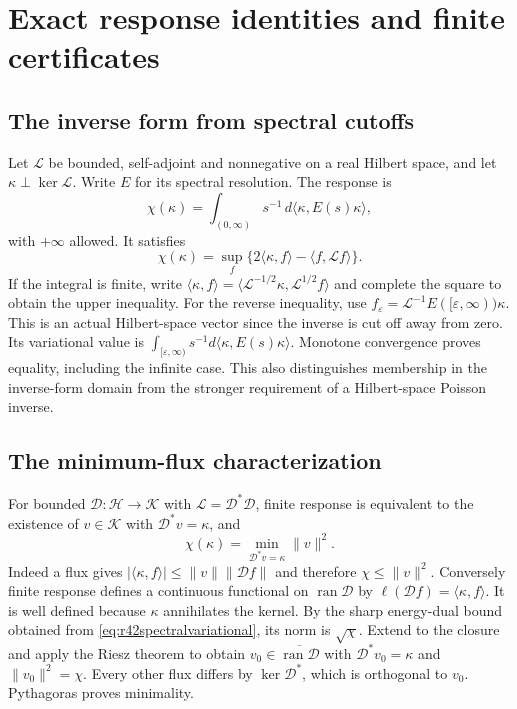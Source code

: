 \section{Exact response identities and finite certificates}
\label{app:r42certificates}

\subsection{The inverse form from spectral cutoffs}
Let $\mathscr L$ be bounded, self-adjoint and nonnegative on a real
Hilbert space, and let $\kappa\perp\ker\mathscr L$. Write $E$ for its
spectral resolution. The response is
\[
 \chi(\kappa)=\int_{(0,\infty)}s^{-1}
                                  \,d\langle\kappa,E(s)\kappa\rangle,
\]
with $+\infty$ allowed. It satisfies
\begin{equation}\label{eq:r42spectralvariational}
 \chi(\kappa)=\sup_f
       \{2\langle\kappa,f\rangle-\langle f,\mathscr Lf\rangle\}.
\end{equation}
If the integral is finite, write
$\langle\kappa,f\rangle=
 \langle\mathscr L^{-1/2}\kappa,\mathscr L^{1/2}f\rangle$
and complete the square to obtain the upper inequality. For the
reverse inequality, use
$f_\varepsilon=\mathscr L^{-1}E([\varepsilon,\infty))\kappa$.
This is an actual Hilbert-space vector since the inverse is cut off
away from zero. Its variational value is
$\int_{[\varepsilon,\infty)}s^{-1}d\langle\kappa,E(s)\kappa\rangle$.
Monotone convergence proves equality, including the infinite case.
This also distinguishes membership in the inverse-form domain from
the stronger requirement of a Hilbert-space Poisson inverse.

\subsection{The minimum-flux characterization}
For bounded $\mathcal D:\mathcal H\to\mathcal K$ with
$\mathscr L=\mathcal D^*\mathcal D$, finite response is equivalent to
the existence of $v\in\mathcal K$ with $\mathcal D^*v=\kappa$, and
\begin{equation}\label{eq:r42minflux}
 \chi(\kappa)=\min_{\mathcal D^*v=\kappa}\|v\|^2.
\end{equation}
Indeed a flux gives
$|\langle\kappa,f\rangle|\le\|v\|\|\mathcal Df\|$ and therefore
$\chi\le\|v\|^2$. Conversely finite response defines a continuous
functional on $\operatorname{ran}\mathcal D$ by
$\ell(\mathcal Df)=\langle\kappa,f\rangle$. It is well defined
because $\kappa$ annihilates the kernel. By the sharp energy-dual
bound obtained from \eqref{eq:r42spectralvariational}, its norm is
$\sqrt\chi$. Extend to the closure and apply the Riesz theorem to
obtain $v_0\in\overline{\operatorname{ran}\mathcal D}$ with
$\mathcal D^*v_0=\kappa$ and $\|v_0\|^2=\chi$.
Every other flux differs by $\ker\mathcal D^*$, which is orthogonal
to $v_0$. Pythagoras proves minimality.

